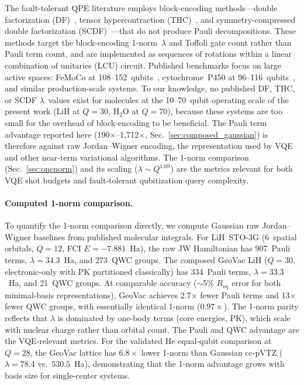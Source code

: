 \documentclass[aps,pra,twocolumn,superscriptaddress,longbibliography]{revtex4-2}
\begin{document}
The fault-tolerant QPE literature employs block-encoding methods---double
factorization (DF)~\cite{motta2021}, tensor hypercontraction
(THC)~\cite{lee2021}, and symmetry-compressed double factorization
(SCDF)~\cite{rocca2024}---that do not produce Pauli decompositions.
These methods target the block-encoding 1-norm~$\lambda$ and Toffoli
gate count rather than Pauli term count, and are implemented as
sequences of rotations within a linear combination of unitaries (LCU)
circuit.  Published benchmarks focus on large active spaces: FeMoCo at
108--152~qubits~\cite{lee2021}, cytochrome~P450 at
96--116~qubits~\cite{caesura2025}, and similar production-scale systems.
To our knowledge, no published DF, THC, or SCDF $\lambda$~values exist
for molecules at the 10--70~qubit operating scale of the present work
(LiH at $Q = 30$, H$_2$O at $Q = 70$), because these systems are too
small for the overhead of block-encoding to be beneficial.
The Pauli term advantage reported here (190$\times$--1,712$\times$,
Sec.~\ref{sec:composed_gaussian}) is therefore against raw
Jordan--Wigner encoding, the representation used by VQE and other
near-term variational algorithms.  The 1-norm comparison
(Sec.~\ref{sec:onenorm}) and its scaling ($\lambda \sim Q^{1.69}$)
are the metrics relevant for both VQE shot budgets and fault-tolerant
qubitization query complexity.

\paragraph{Computed 1-norm comparison.}
To quantify the 1-norm comparison directly, we compute Gaussian raw
Jordan--Wigner baselines from published molecular integrals.
For LiH~STO-3G (6~spatial orbitals, $Q = 12$, FCI $E = -7.881$~Ha),
the raw JW Hamiltonian has 907~Pauli terms, $\lambda = 34.3$~Ha, and
273~QWC groups.  The composed GeoVac LiH ($Q = 30$, electronic-only
with PK partitioned classically) has 334~Pauli terms,
$\lambda = 33.3$~Ha, and 21~QWC groups.  At comparable accuracy
($\sim$5\% $R_\mathrm{eq}$ error for both minimal-basis representations),
GeoVac achieves 2.7$\times$ fewer Pauli terms and 13$\times$ fewer
QWC groups, with essentially identical 1-norm ($0.97\times$).
The 1-norm parity reflects that $\lambda$ is dominated by one-body
terms (core energies, PK), which scale with nuclear charge rather than
orbital count.  The Pauli and QWC advantage are the VQE-relevant
metrics.  For the validated He equal-qubit comparison at $Q = 28$,
the GeoVac lattice has $6.8\times$ lower 1-norm than Gaussian
cc-pVTZ ($\lambda = 78.4$ vs.\ $530.5$~Ha), demonstrating that the
1-norm advantage grows with basis size for single-center systems.
\end{document}

